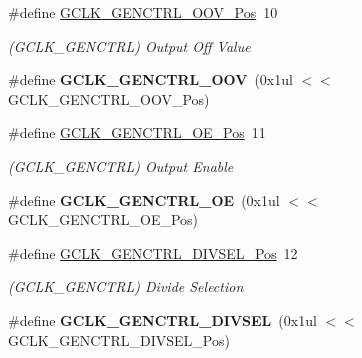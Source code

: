 \begin{DoxyCompactItemize}
\item 
\hypertarget{group___s_a_m_l21___g_c_l_k_ga511f960dfd2a4afa6dc073dc909389ac}{}\#define \hyperlink{group___s_a_m_l21___g_c_l_k_ga511f960dfd2a4afa6dc073dc909389ac}{G\+C\+L\+K\+\_\+\+G\+E\+N\+C\+T\+R\+L\+\_\+\+O\+O\+V\+\_\+\+Pos}~10\label{group___s_a_m_l21___g_c_l_k_ga511f960dfd2a4afa6dc073dc909389ac}

\begin{DoxyCompactList}\small\item\em (G\+C\+L\+K\+\_\+\+G\+E\+N\+C\+T\+R\+L) Output Off Value \end{DoxyCompactList}\item 
\hypertarget{group___s_a_m_l21___g_c_l_k_ga80c2684d81c5b9433098ae98bd7cc989}{}\#define {\bfseries G\+C\+L\+K\+\_\+\+G\+E\+N\+C\+T\+R\+L\+\_\+\+O\+O\+V}~(0x1ul $<$$<$ G\+C\+L\+K\+\_\+\+G\+E\+N\+C\+T\+R\+L\+\_\+\+O\+O\+V\+\_\+\+Pos)\label{group___s_a_m_l21___g_c_l_k_ga80c2684d81c5b9433098ae98bd7cc989}

\item 
\hypertarget{group___s_a_m_l21___g_c_l_k_ga463727f09be9f9cf1f26c55e954eaf0e}{}\#define \hyperlink{group___s_a_m_l21___g_c_l_k_ga463727f09be9f9cf1f26c55e954eaf0e}{G\+C\+L\+K\+\_\+\+G\+E\+N\+C\+T\+R\+L\+\_\+\+O\+E\+\_\+\+Pos}~11\label{group___s_a_m_l21___g_c_l_k_ga463727f09be9f9cf1f26c55e954eaf0e}

\begin{DoxyCompactList}\small\item\em (G\+C\+L\+K\+\_\+\+G\+E\+N\+C\+T\+R\+L) Output Enable \end{DoxyCompactList}\item 
\hypertarget{group___s_a_m_l21___g_c_l_k_ga2d6d57ade8be094e5b3076e347eaabd7}{}\#define {\bfseries G\+C\+L\+K\+\_\+\+G\+E\+N\+C\+T\+R\+L\+\_\+\+O\+E}~(0x1ul $<$$<$ G\+C\+L\+K\+\_\+\+G\+E\+N\+C\+T\+R\+L\+\_\+\+O\+E\+\_\+\+Pos)\label{group___s_a_m_l21___g_c_l_k_ga2d6d57ade8be094e5b3076e347eaabd7}

\item 
\hypertarget{group___s_a_m_l21___g_c_l_k_gae17e18184623ee038ce57b64c63e4f9a}{}\#define \hyperlink{group___s_a_m_l21___g_c_l_k_gae17e18184623ee038ce57b64c63e4f9a}{G\+C\+L\+K\+\_\+\+G\+E\+N\+C\+T\+R\+L\+\_\+\+D\+I\+V\+S\+E\+L\+\_\+\+Pos}~12\label{group___s_a_m_l21___g_c_l_k_gae17e18184623ee038ce57b64c63e4f9a}

\begin{DoxyCompactList}\small\item\em (G\+C\+L\+K\+\_\+\+G\+E\+N\+C\+T\+R\+L) Divide Selection \end{DoxyCompactList}\item 
\hypertarget{group___s_a_m_l21___g_c_l_k_ga5b38723ccce77a0257a48ce83389b204}{}\#define {\bfseries G\+C\+L\+K\+\_\+\+G\+E\+N\+C\+T\+R\+L\+\_\+\+D\+I\+V\+S\+E\+L}~(0x1ul $<$$<$ G\+C\+L\+K\+\_\+\+G\+E\+N\+C\+T\+R\+L\+\_\+\+D\+I\+V\+S\+E\+L\+\_\+\+Pos)\label{group___s_a_m_l21___g_c_l_k_ga5b38723ccce77a0257a48ce83389b204}


\end{DoxyCompactItemize}
